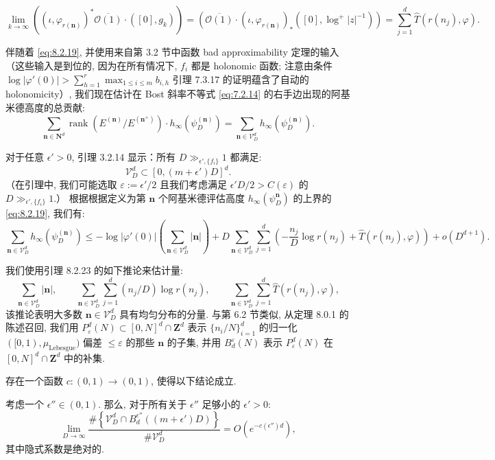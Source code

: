 \[ \lim_{k \to \infty} \left( (\iota, \varphi_{r(\mathbf{n})})^* \overline{\mathcal{O}(1)} \cdot ([0], g_k) \right) = \left( \overline{\mathcal{O}(1)} \cdot (\iota, \varphi_{r(\mathbf{n})})_* ([0], \log^+ |z|^{-1}) \right) = \sum_{j=1}^d \widehat{T}(r(n_j), \varphi). \]

伴随着 \eqref{eq:8.2.19}, 并使用来自第 3.2 节中函数 bad approximability 定理的输入（这些输入是到位的, 
因为在所有情况下, \(f_i\) 都是 holonomic 函数; 
注意由条件 \(\log |\varphi'(0)| > \sum_{h=1}^r \max_{1 \leq i \leq m} b_{i,h}\) 引理 7.3.17 的证明蕴含了自动的 holonomicity）, 
我们现在估计在 Bost 斜率不等式 \eqref{eq:7.2.14} 的右手边出现的阿基米德高度的总贡献:
\[ \sum_{\mathbf{n} \in \mathbf{N}^d} \operatorname{rank} \left( E^{(\mathbf{n})} / E^{(\mathbf{n}^+)} \right) \cdot h_{\infty}(\psi_D^{(\mathbf{n})}) = \sum_{\mathbf{n} \in \mathcal{V}_D^d} h_{\infty}(\psi_D^{(\mathbf{n})}). \]

对于任意 \(\epsilon' > 0\), 引理 3.2.14 显示：所有 \(D \gg_{\epsilon',\{f_i\}} 1\) 都满足:
\[ \mathcal{V}_D^d \subset \left[0, (m+\epsilon')D\right]^d. \]
（在引理中, 我们可能选取 \(\varepsilon := \epsilon'/2\) 且我们考虑满足 \(\epsilon' D/2 > C(\varepsilon)\) 的 \(D \gg_{\epsilon',\{f_i\}} 1\).） 
根据根据定义为第 \(\mathbf{n}\) 个阿基米德评估高度 \(h_{\infty}\left(\psi_D^{\mathbf{n}}\right)\) 的上界的 \eqref{eq:8.2.19}, 我们有:
\begin{equation}\label{eq:8.2.22}
\sum_{\mathbf{n}\in\mathcal{V}_D^d}h_\infty(\psi_D^{(\mathbf{n})}) \leq -\log|\varphi'(0)|\left(\sum_{\mathbf{n}\in\mathcal{V}_D^d}|\mathbf{n}|\right) + D\sum_{\mathbf{n}\in\mathcal{V}_D^d}\sum_{j=1}^d\left(-\frac{n_j}{D}\log r(n_j) + \widehat{T}(r(n_j),\varphi)\right) + o(D^{d+1}).
\end{equation}

我们使用引理 8.2.23 的如下推论来估计量:
\[ \sum_{\mathbf{n} \in \mathcal{V}_D^d} |\mathbf{n}|, \qquad \sum_{\mathbf{n} \in \mathcal{V}_D^d} \sum_{j=1}^d (n_j/D) \log r(n_j), \qquad \sum_{\mathbf{n} \in \mathcal{V}_D^d} \sum_{j=1}^d \widehat{T}(r(n_j), \varphi), \]
该推论表明大多数 \(\mathbf{n} \in \mathcal{V}_D^d\) 具有均匀分布的分量. 
与第 6.2 节类似, 从定理 8.0.1 的陈述召回, 
我们用 \(P_{\varepsilon}^d(N) \subset [0,N]^d \cap \mathbf{Z}^d\) 表示 \(\{n_i/N\}_{i=1}^d\) 的归一化 \(([0,1),\mu_{\text{Lebesgue}})\) 偏差 \(\leq \varepsilon\) 的那些 \(\mathbf{n}\) 的子集, 
并用 \(B_d^{\varepsilon}(N)\) 表示 \(P_{\varepsilon}^d(N)\) 在 \([0,N]^d \cap \mathbf{Z}^d\) 中的补集.

\begin{lemma}\label{lem:8.2.23}
存在一个函数 \(c:(0,1)\to(0,1)\), 使得以下结论成立.

考虑一个 \(\epsilon'' \in (0,1)\). 
那么, 对于所有关于 \(\epsilon''\) 足够小的 \(\epsilon' > 0\):
\[ \lim_{D \to \infty} \frac{\# \left\{ \mathcal{V}_D^d \cap B_d^{\epsilon''} \left( (m + \epsilon') D \right) \right\}}{\# \mathcal{V}_D^d} = O\left( e^{-c(\epsilon'') d} \right), \]
其中隐式系数是绝对的.
\end{lemma}

